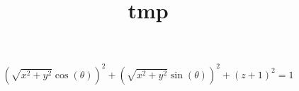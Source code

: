 
\title{tmp}
\usepackage{cancel}



\[
	\left(\sqrt{x^{2}+y^{2}}\cos\left(\theta\right)\right)^{2}+\left(\sqrt{x^{2}+y^{2}}\sin\left(\theta\right)\right)^{2}+\left(z+1\right)^{2}=1
\]



